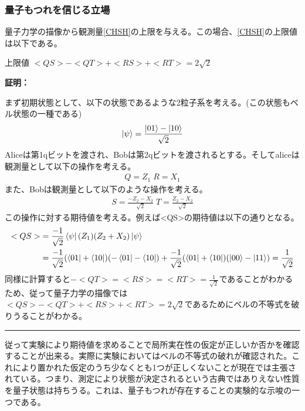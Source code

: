 \documentclass[a4paper,10.5pt]{article}
\numberwithin{equation}{section}
\newenvironment{proofbox}
{\begin{prooflabel}\textbf{証明：}\end{prooflabel}\vspace{0.8em}}
{\par\vspace{1em}\hrule\vspace{1em}}
\begin{document}
\subsubsection{量子もつれを信じる立場}
量子力学の描像から観測量\eqref{CHSH}の上限を与える。この場合、\eqref{CHSH}の上限値は以下である。
\begin{resultbox}{上限値}
$<QS>-<QT>+<RS>+<RT>=2\sqrt{2}$
\end{resultbox}
\begin{proofbox}
まず初期状態として、以下の状態であるような2粒子系を考える。(この状態もベル状態の一種である)
\begin{equation}\begin{split}
    \ket{\psi}=\frac{\ket{01}-\ket{10}}{\sqrt{2}}
\end{split} \end{equation}
Aliceは第1qビットを渡され、Bobは第2qビットを渡されるとする。そしてaliceは観測量として以下の操作を考える。
\begin{equation}\begin{split}
    Q=Z_{1}\;R=X_{1}
\end{split} \end{equation}
また、Bobは観測量として以下のような操作を考える。
\begin{equation}\begin{split}
    S=\frac{-Z_{2}-X_{2}}{\sqrt{2}} \; T=\frac{Z_{2}-X_{2}}{\sqrt{2}}
\end{split} \end{equation}
この操作に対する期待値を考える。例えば<QS>の期待値は以下の通りとなる。
\begin{equation}\begin{split}
    <QS> &= \frac{-1}{\sqrt{2}} \bra{\psi}(Z_{1})(Z_{2}+X_{2})\ket{\psi}\\  
         &= \frac{-1}{\sqrt{2}} (\bra{01}+\bra{10}) (-\bra{01}-\bra{10})
         + \frac{-1}{\sqrt{2}} (\bra{01}+\bra{10}) (\ket{00}-\ket{11})
         =\frac{1}{\sqrt{2}}
\end{split} \end{equation}
同様に計算すると$-<QT>=<RS>=<RT>=\frac{1}{\sqrt{2}}$であることがわかるため、従って量子力学の描像では$<QS>-<QT>+<RS>+<RT>=2\sqrt{2}$であるためにベルの不等式を破りうることがわかる。
\end{proofbox}
従って実験により期待値を求めることで局所実在性の仮定が正しいか否かを確認することが出来る。実際に実験においてはベルの不等式の破れが確認された。これにより置かれた仮定のうち少なくとも1つが正しくないことが現在では主張されている。つまり、測定により状態が決定されるという古典ではありえない性質を量子状態は持ちうる。これは、量子もつれが存在することの実験的な示唆の一つである。
 
\end{document}

